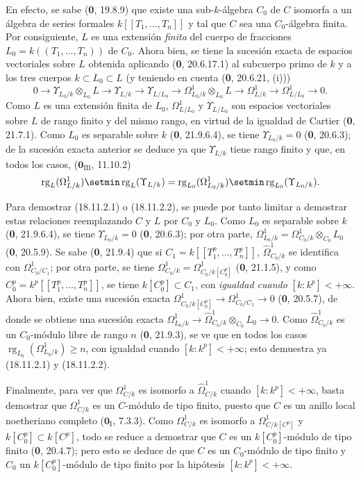 En efecto, se sabe (\textbf 0, 19.8.9) que existe una sub-$k$-álgebra $C_0$ de $C$ isomorfa a un álgebra de series formales $k[[T_1,\ldots,T_n]]$ y tal que $C$ sea una $C_0$-álgebra finita. Por consiguiente, $L$ es una extensión \emph{finita} del cuerpo de fracciones $L_0=k((T_1,\ldots,T_n))$ de $C_0$. Ahora bien, se tiene la sucesión exacta de espacios vectoriales sobre $L$ obtenida aplicando (\textbf 0, 20.6.17.1) al subcuerpo primo de $k$ y a los tres cuerpos $k\subset L_0\subset L$ (y teniendo en cuenta (\textbf 0, 20.6.21, (i)))
\[
  0\to\Upsilon_{L_0/k}\otimes_{L_0}L\to\Upsilon_{L/k}\to\Upsilon_{L/L_0}
  \to\Omega^1_{L_0/k}\otimes_{L_0}L\to\Omega^1_{L/k}\to\Omega^1_{L/L_0}\to0.
\]
Como $L$ es una extensión finita de $L_0$, $\Omega^1_{L/L_0}$ y $\Upsilon_{L/L_0}$ son espacios vectoriales sobre $L$ de rango finito y del mismo rango, en virtud de la igualdad de Cartier (\textbf 0, 21.7.1). Como $L_0$ es separable sobre $k$ (\textbf 0, 21.9.6.4), se tiene $\Upsilon_{L_0/k}=0$ (\textbf 0, 20.6.3); de la sucesión exacta anterior se deduce ya que $\Upsilon_{L/k}$ tiene rango finito y que, en todos los casos, ($\mathbf{0}_{\mathrm{III}}$, 11.10.2)
\[
  \operatorname{rg}_L(\Omega^1_{L/k})\setmin\operatorname{rg}_L(\Upsilon_{L/k})
  =\operatorname{rg}_{L_0}(\Omega^1_{L_0/k})\setmin\operatorname{rg}_{L_0}(\Upsilon_{L_0/k}).
\]

Para demostrar (18.11.2.1) o (18.11.2.2), se puede por tanto limitar a demostrar estas relaciones reemplazando $C$ y $L$ por $C_0$ y $L_0$. Como $L_0$ es separable sobre $k$ (\textbf 0, 21.9.6.4), se tiene $\Upsilon_{L_0/k}=0$ (\textbf 0, 20.6.3); por otra parte, $\Omega^1_{L_0/k}=\Omega^1_{C_0/k}\otimes_{C_0}L_0$ (\textbf 0, 20.5.9). Se sabe (\textbf 0, 21.9.4) que si $C_1=k[[T_1^p,\ldots,T_n^p]]$, $\hat{\Omega}^1_{C_0/k}$ se identifica con $\Omega^1_{C_0/C_1}$; por otra parte, se tiene $\Omega^1_{C_0/k}=\Omega^1_{C_0/k[C_0^p]}$ (\textbf 0, 21.1.5), y como $C_0^p=k^p[[T_1^p,\ldots,T_n^p]]$, se tiene $k[C_0^p]\subset C_1$, con \emph{igualdad cuando} $[k:k^p]<+\infty$. Ahora bien, existe una sucesión exacta $\Omega^1_{C_0/k[C_0^p]}\to\Omega^1_{C_0/C_1}\to0$ (\textbf 0, 20.5.7), de donde se obtiene una sucesión exacta $\Omega^1_{L_0/k}\to\hat{\Omega}^1_{C_0/k}\otimes_{C_0}L_0\to0$. Como $\hat{\Omega}^1_{C_0/k}$ es un $C_0$-módulo libre de rango $n$ (\textbf 0, 21.9.3), se ve que en todos los casos $\operatorname{rg}_{L_0}(\Omega^1_{L_0/k})\geq n$, con igualdad cuando $[k:k^p]<+\infty$; esto demuestra ya (18.11.2.1) y (18.11.2.2).

Finalmente, para ver que $\Omega^1_{C/k}$ es isomorfo a $\hat{\Omega}^1_{C/k}$ cuando $[k:k^p]<+\infty$, basta demostrar que $\Omega^1_{C/k}$ es un $C$-módulo de tipo finito, puesto que $C$ es un anillo local noetheriano completo ($\mathbf{0}_{\mathrm I}$, 7.3.3). Como $\Omega^1_{C/k}$ es isomorfo a $\Omega^1_{C/k[C^p]}$ y $k[C_0^p]\subset k[C^p]$, todo se reduce a demostrar que $C$ es un $k[C_0^p]$-módulo de tipo finito (\textbf 0, 20.4.7); pero esto se deduce de que $C$ es un $C_0$-módulo de tipo finito y $C_0$ un $k[C_0^p]$-módulo de tipo finito por la hipótesis $[k:k^p]<+\infty$.

